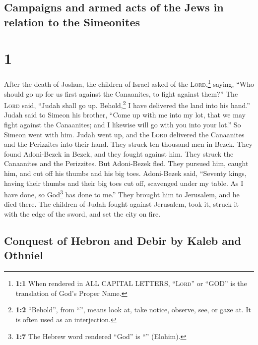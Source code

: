 \hypertarget{campaigns-and-armed-acts-of-the-jews-in-relation-to-the-simeonites}{%
\subsection{Campaigns and armed acts of the Jews in relation to the
Simeonites}\label{campaigns-and-armed-acts-of-the-jews-in-relation-to-the-simeonites}}

\hypertarget{section}{%
\section{1}\label{section}}

 After the death of Joshua, the children of Israel asked
of the \textsc{Lord},\footnote{\textbf{1:1} When rendered in ALL CAPITAL
  LETTERS, ``\textsc{Lord}'' or ``GOD'' is the translation of God's
  Proper Name.} saying, ``Who should go up for us first against the
Canaanites, to fight against them?''  The \textsc{Lord}
said, ``Judah shall go up. Behold,\footnote{\textbf{1:2} ``Behold'',
  from ``'', means look at, take notice, observe, see, or
  gaze at. It is often used as an interjection.} I have delivered the
land into his hand.''  Judah said to Simeon his brother,
``Come up with me into my lot, that we may fight against the Canaanites;
and I likewise will go with you into your lot.'' So Simeon went with
him.  Judah went up, and the \textsc{Lord} delivered the
Canaanites and the Perizzites into their hand. They struck ten thousand
men in Bezek.  They found Adoni-Bezek in Bezek, and they
fought against him. They struck the Canaanites and the Perizzites.
 But Adoni-Bezek fled. They pursued him, caught him, and
cut off his thumbs and his big toes.  Adoni-Bezek said,
``Seventy kings, having their thumbs and their big toes cut off,
scavenged under my table. As I have done, so God\footnote{\textbf{1:7}
  The Hebrew word rendered ``God'' is ``'' (Elohim).} has
done to me.'' They brought him to Jerusalem, and he died there.
 The children of Judah fought against Jerusalem, took it,
struck it with the edge of the sword, and set the city on fire.

\hypertarget{conquest-of-hebron-and-debir-by-kaleb-and-othniel}{%
\subsection{Conquest of Hebron and Debir by Kaleb and
Othniel}\label{conquest-of-hebron-and-debir-by-kaleb-and-othniel}}

